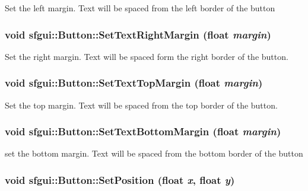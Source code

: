 Set the left margin. Text will be spaced from the left border of the button \hypertarget{classsfgui_1_1Button_4a4b4c339d001a0578c5e70b01ef164b}{
\subsubsection[SetTextRightMargin]{\setlength{\rightskip}{0pt plus 5cm}void sfgui::Button::SetTextRightMargin (float {\em margin})}}
\label{classsfgui_1_1Button_4a4b4c339d001a0578c5e70b01ef164b}




Set the right margin. Text will be spaced form the right border of the button. \hypertarget{classsfgui_1_1Button_cd571ac750ad4f9f957da40fb1ae23d7}{
\subsubsection[SetTextTopMargin]{\setlength{\rightskip}{0pt plus 5cm}void sfgui::Button::SetTextTopMargin (float {\em margin})}}
\label{classsfgui_1_1Button_cd571ac750ad4f9f957da40fb1ae23d7}




Set the top margin. Text will be spaced from the top border of the button. \hypertarget{classsfgui_1_1Button_18a553fdcfbcf42d7764d3e039a72708}{
\subsubsection[SetTextBottomMargin]{\setlength{\rightskip}{0pt plus 5cm}void sfgui::Button::SetTextBottomMargin (float {\em margin})}}
\label{classsfgui_1_1Button_18a553fdcfbcf42d7764d3e039a72708}




set the bottom margin. Text will be spaced from the bottom border of the button \hypertarget{classsfgui_1_1Button_4160a1abdec76e06db9b34b80f5fa12c}{
\subsubsection[SetPosition]{\setlength{\rightskip}{0pt plus 5cm}void sfgui::Button::SetPosition (float {\em x}, \/  float {\em y})}}
\label{classsfgui_1_1Button_4160a1abdec76e06db9b34b80f5fa12c}




